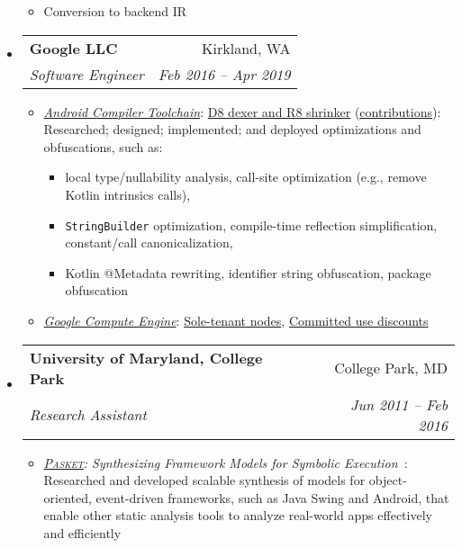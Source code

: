 \documentclass[letterpaper,11pt]{article}
\makeatletter
\newcommand{\ressubheading}[4]{
\begin{tabular*}{6.5in}{l@{\extracolsep{\fill}}r}
    \textbf{#1} & #2 \\
    \textit{#3} & \textit{#4} \\
\end{tabular*}\vspace{-6pt}}
\makeatother
\begin{document}
\begin{itemize}
{\begin{itemize}
\begin{itemize}
\item Conversion to backend IR
\end{itemize}
        \end{itemize}
        }
    \item
      \ressubheading{{Google LLC}}{Kirkland, WA}{Software Engineer}{Feb 2016 -- Apr 2019}
        {
\small
        \begin{itemize}
\item\emph{\href{https://developer.android.com/studio/preview/index.html}{Android Compiler Toolchain}}:
\href{https://r8.googlesource.com/r8}{D8 dexer and R8 shrinker} (\href{https://r8-review.googlesource.com/q/author:jsjeon+status:merged}{\underline{contributions}}):
Researched; designed; implemented; and deployed optimizations and obfuscations, such as:
\begin{itemize}
\item local type/nullability analysis, call-site optimization (e.g., remove Kotlin intrinsics calls),
\item \texttt{StringBuilder} optimization, compile-time reflection simplification, constant/call canonicalization,
\item Kotlin @Metadata rewriting, identifier string obfuscation, package obfuscation
\end{itemize}
\item\emph{\href{https://cloud.google.com/compute/}{Google Compute Engine}}:
\href{https://cloudplatform.googleblog.com/2018/06/Introducing-sole-tenant-nodes-for-Google-Compute-Engine.html}{Sole-tenant nodes},
\href{https://cloudplatform.googleblog.com/2017/09/committed-use-discounts-for-Google-Compute-Engine-now-generally-available.html}{Committed use discounts}
        \end{itemize}
        }
    \item
      \ressubheading{{University of Maryland, College Park}}{College Park, MD}{Research Assistant}{Jun 2011 -- Feb 2016}
        {
\small
        \begin{itemize}
\item\emph{\href{https://github.com/plum-umd/pasket}{\textsc{Pasket}}: Synthesizing Framework Models for Symbolic Execution}~\cite{FMSD17, icse16, fse15, cav15}: %
Researched and developed scalable synthesis of models for object-oriented,
event-driven frameworks, such as Java Swing and Android,
that enable other static analysis tools
to analyze real-world apps effectively and efficiently


\end{itemize}}
\end{itemize}
\end{document}
